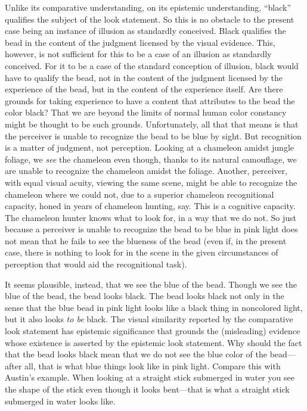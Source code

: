 \documentclass[12pt]{article}
\begin{document}
Unlike its comparative understanding, on its epistemic understanding, ``black'' qualifies the subject of the look statement. So this is no obstacle to the present case being an instance of illusion as standardly conceived. Black qualifies the bead in the content of the judgment licensed by the visual evidence. This, however, is not sufficient for this to be a case of an illusion as standardly conceived. For it to be a case of the standard conception of illusion, black would have to qualify the bead, not in the content of the judgment licensed by the experience of the bead, but in the content of the experience itself. Are there grounds for taking experience to have a content that attributes to the bead the color black? That we are beyond the limits of normal human color constancy might be thought to be such grounds. Unfortunately, all that that means is that the perceiver is unable to recognize the bead to be blue by sight. But recognition is a matter of judgment, not perception. Looking at a chameleon amidst jungle foliage, we \emph{see} the chameleon even though, thanks to its natural camouflage, we are unable to recognize the chameleon amidst the foliage. Another, perceiver, with equal visual acuity, viewing the same scene, might be able to recognize the chameleon where we could not, due to a superior chameleon recognitional capacity, honed in years of chameleon hunting, say. This is a cognitive capacity. The chameleon hunter knows what to look for, in a way that we do not. So just because a perceiver is unable to recognize the bead to be blue in pink light does not mean that he fails to see the blueness of the bead (even if, in the present case, there is nothing to look for in the scene in the given circumstances of perception that would aid the recognitional task).

It seems plausible, instead, that we see the blue of the bead. Though we see the blue of the bead, the bead looks black. The bead looks black not only in the sense that the blue bead in pink light looks like a black thing in noncolored light, but it also looks \emph{to be} black. The visual similarity reported by the comparative look statement has epistemic significance that grounds the (misleading) evidence whose existence is asserted by the epistemic look statement. Why should the fact that the bead looks black mean that we do not see the blue color of the bead---after all, that is what blue things look like in pink light. Compare this with Austin's \citeyear{Austin:1962lr} example. When looking at a straight stick submerged in water you see the shape of the stick even though it looks bent---that is what a straight stick submerged in water looks like. 
\end{document}
